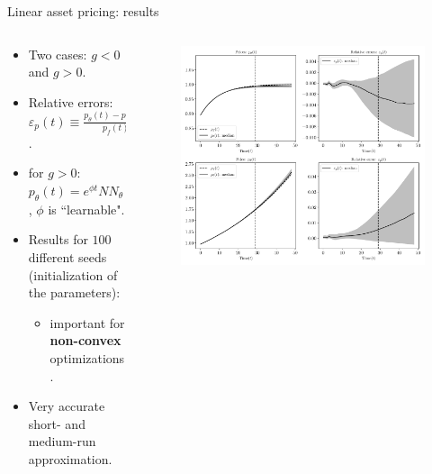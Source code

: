 \documentclass[aspectratio=169,10pt]{beamer}
\newcommand{\emphcolor}[1]{\textbf{\textcolor{emphcolorval}{#1}}}
\begin{document}
\begin{frame}{Linear asset pricing: results}
	\begin{columns}
		\begin{column}{0.5\textwidth}
			\begin{itemize}
				\item Two cases: $g<0$ and $g>0$.
				\vspace{0.05in}
				\item Relative errors: $\varepsilon_p(t)\equiv \frac{p_\theta(t)-p_f(t)}{p_f(t)}$.
				\vspace{0.05in}
				\item for $g>0$: $p_\theta(t) = e^{\phi t}
			 NN_\theta(t)$, $\phi$ is ``learnable".
			 	\vspace{0.05in}
				\item Results for $100$ different seeds (initialization of the parameters):
				\begin{itemize}
					\item important for \emphcolor{non-convex} optimizations.
				\end{itemize} 
				\vspace{0.05in}
				\item Very accurate short- and medium-run approximation.
			\end{itemize}
		\end{column}
		\begin{column}{0.5\textwidth}
			\begin{figure}[t!]
				\centering
				\includegraphics[width=\textwidth]{figs/asset_pricing_sequential_combined.pdf}
				\vspace{-7mm}
			\end{figure}
		\end{column}
	\end{columns}
\end{frame}
\end{document}
